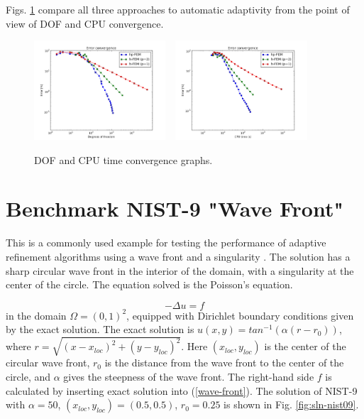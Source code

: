 \documentclass[12pt]{elsarticle}
\begin{document}
Figs. \ref{fig:nist-8-conv} compare all
three approaches to automatic adaptivity from the point
of view of DOF and CPU convergence.

\begin{figure}[H]
\centering
\vspace{-5mm}
\includegraphics[height=3.7cm]{nist/nist-8/conv_dof_aniso.png}\ \
\includegraphics[height=3.7cm]{nist/nist-8/conv_cpu_aniso.png}
\vspace{-5mm}
\caption{DOF and CPU time convergence graphs.}
\vspace{-5mm}
\label{fig:nist-8-conv}
\vspace{-2mm}
\end{figure}


\section{Benchmark NIST-9 "Wave Front"}
\label{sec:bench-9}

This is a commonly used example for testing the performance of
adaptive refinement algorithms using a wave front and a singularity \cite{mitchell-1, mitchell-2}.
The solution has a sharp circular wave front in the interior of the
domain, with a singularity at the center of the circle.
The equation solved is the Poisson's equation.

\begin{equation} \label{wave-front}
-\Delta u = f
\end{equation}
in the domain $\Omega = (0, 1)^2$, equipped with Dirichlet boundary conditions
given by the exact solution. The exact solution is
$u(x, y) = tan^{-1}(\alpha (r - r_{0}))$,
where $r = \sqrt{(x - x_{loc})^{2} + (y - y_{loc})^{2}}$.
Here $(x_{loc}, y_{loc})$ is the center of the circular wave front,
$r_{0}$ is the distance from the wave front to the center of the circle,
and $\alpha$ gives the steepness of the wave front.
The right-hand side $f$ is calculated by inserting exact solution into (\ref{wave-front}).
The solution of NIST-9 with $\alpha = 50$, $(x_{loc}, y_{loc}) = (0.5, 0.5)$,
$r_{0} = 0.25$ is shown in Fig. \ref{fig:sln-nist09}.
\end{document}

